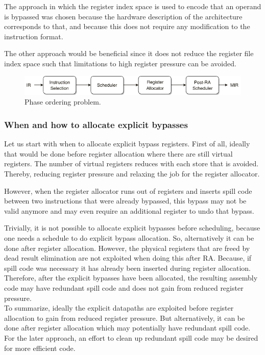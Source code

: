 The approach in which the register index space is used to encode that an operand is bypassed was chosen because the hardware description of the architecture corresponds to that, and because this does not require any modification to the instruction format.

The other approach would be beneficial since it does not reduce the register file index space such that limitations to high register pressure can be avoided.


\begin{figure}[b]
\centering
\includegraphics[width=.9\textwidth]{figures/phase_ordering}
\caption{Phase ordering problem.}
\label{fig:phase_ordering}
\end{figure}

\subsubsection{When and how to allocate explicit bypasses}
Let us start with when to allocate explicit bypass registers. First of all, ideally that would be done before register allocation where there are still virtual registers. The number of virtual registers reduces with each store that is avoided. Thereby, reducing register pressure and relaxing the job for the register allocator.

However, when the register allocator runs out of registers and inserts spill code between two instructions that were already bypassed, this bypass may not be valid anymore and may even require an additional register to undo that bypass.

Trivially, it is not possible to allocate explicit bypasses before scheduling, because one needs a schedule to do explicit bypass allocation. %
So, alternatively it can be done after register allocation. However, the physical registers that are freed by dead result elimination are not exploited when doing this after RA. Because, if spill code was necessary it has already been inserted during register allocation. Therefore, after the explicit bypasses have been allocated, the resulting assembly code may have redundant spill code and does not gain from reduced register pressure.\\

To summarize, ideally the explicit datapaths are exploited before register allocation to gain from reduced register pressure. But alternatively, it can be done after register allocation which may potentially have redundant spill code. For the later approach, an effort to clean up redundant spill code may be desired for more efficient code.\\


